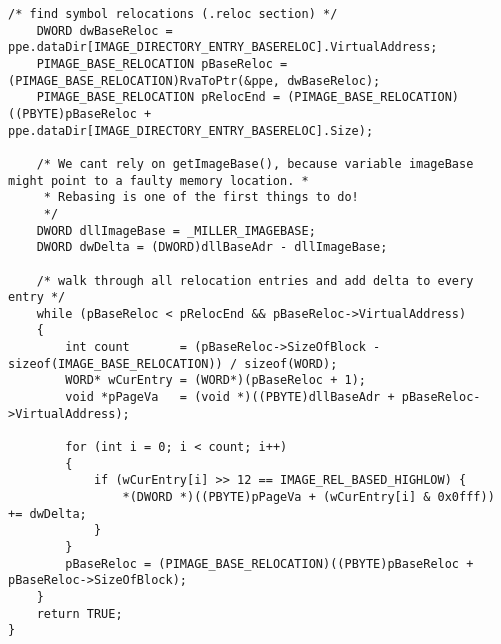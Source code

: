 \documentclass{article}
\begin{document}
\begin{lstlisting}[frame=single]
    /* find symbol relocations (.reloc section) */
    DWORD dwBaseReloc = ppe.dataDir[IMAGE_DIRECTORY_ENTRY_BASERELOC].VirtualAddress;
    PIMAGE_BASE_RELOCATION pBaseReloc = (PIMAGE_BASE_RELOCATION)RvaToPtr(&ppe, dwBaseReloc);
    PIMAGE_BASE_RELOCATION pRelocEnd = (PIMAGE_BASE_RELOCATION)((PBYTE)pBaseReloc + ppe.dataDir[IMAGE_DIRECTORY_ENTRY_BASERELOC].Size);

    /* We cant rely on getImageBase(), because variable imageBase might point to a faulty memory location. *
     * Rebasing is one of the first things to do!
     */
    DWORD dllImageBase = _MILLER_IMAGEBASE;
    DWORD dwDelta = (DWORD)dllBaseAdr - dllImageBase;

    /* walk through all relocation entries and add delta to every entry */
    while (pBaseReloc < pRelocEnd && pBaseReloc->VirtualAddress)
    {
        int count       = (pBaseReloc->SizeOfBlock - sizeof(IMAGE_BASE_RELOCATION)) / sizeof(WORD);
        WORD* wCurEntry = (WORD*)(pBaseReloc + 1);
        void *pPageVa   = (void *)((PBYTE)dllBaseAdr + pBaseReloc->VirtualAddress);

        for (int i = 0; i < count; i++)
        {
            if (wCurEntry[i] >> 12 == IMAGE_REL_BASED_HIGHLOW) {
                *(DWORD *)((PBYTE)pPageVa + (wCurEntry[i] & 0x0fff)) += dwDelta;
            }
        }
        pBaseReloc = (PIMAGE_BASE_RELOCATION)((PBYTE)pBaseReloc + pBaseReloc->SizeOfBlock);
    }
    return TRUE;
}
\end{lstlisting}
\end{document}
